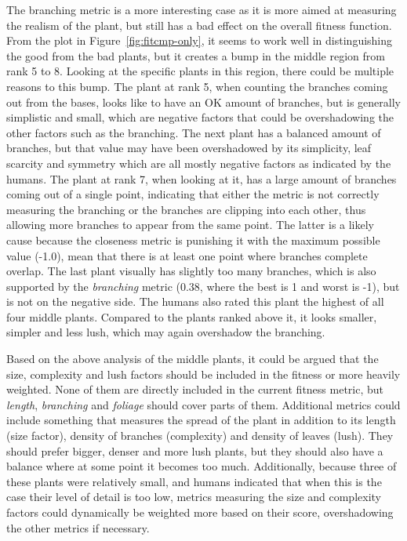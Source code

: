 The branching metric is a more interesting case as it is more aimed at measuring the realism of the plant, but still has a bad effect on the overall fitness function.
From the plot in Figure~\ref{fig:fitcmp-only}, it seems to work well in distinguishing the good from the bad plants, but it creates a bump in the middle region from rank 5 to 8.
Looking at the specific plants in this region, there could be multiple reasons to this bump.
The plant at rank 5, when counting the branches coming out from the bases, looks like to have an OK amount of branches, but is generally simplistic and small, which are negative factors that could be overshadowing the other factors such as the branching.
The next plant has a balanced amount of branches, but that value may have been overshadowed by its simplicity, leaf scarcity and symmetry which are all mostly negative factors as indicated by the humans.
The plant at rank 7, when looking at it, has a large amount of branches coming out of a single point, indicating that either the metric is not correctly measuring the branching or the branches are clipping into each other, thus allowing more branches to appear from the same point.
The latter is a likely cause because the closeness metric is punishing it with the maximum possible value (-1.0), mean that there is at least one point where branches complete overlap.
The last plant visually has slightly too many branches, which is also supported by the \textit{branching} metric (0.38, where the best is 1 and worst is -1), but is not on the negative side.
The humans also rated this plant the highest of all four middle plants.
Compared to the plants ranked above it, it looks smaller, simpler and less lush, which may again overshadow the branching.

Based on the above analysis of the middle plants, it could be argued that the size, complexity and lush factors should be included in the fitness or more heavily weighted.
None of them are directly included in the current fitness metric, but \textit{length}, \textit{branching} and \textit{foliage} should cover parts of them.
Additional metrics could include something that measures the spread of the plant in addition to its length (size factor), density of branches (complexity) and density of leaves (lush).
They should prefer bigger, denser and more lush plants, but they should also have a balance where at some point it becomes too much.
Additionally, because three of these plants were relatively small, and humans indicated that when this is the case their level of detail is too low, metrics measuring the size and complexity factors could dynamically be weighted more based on their score, overshadowing the other metrics if necessary.

